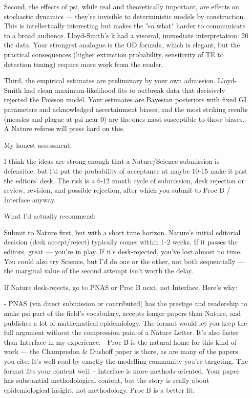   Second, the effects of psi, while real and theoretically important, are effects on stochastic
  dynamics --- they're invisible to deterministic models by construction. This is intellectually
  interesting but makes the "so what" harder to communicate to a broad audience. Lloyd-Smith's k had
  a visceral, immediate interpretation: 20%
   the data. Your strongest analogue is the OD formula, which is elegant, but the practical
  consequences (higher extinction probability, sensitivity of TE to detection timing) require more
  work from the reader.

  Third, the empirical estimates are preliminary by your own admission. Lloyd-Smith had clean
  maximum-likelihood fits to outbreak data that decisively rejected the Poisson model. Your estimates
   are Bayesian posteriors with fixed GI parameters and acknowledged ascertainment biases, and the
  most striking results (measles and plague at psi near 0) are the ones most susceptible to those
  biases. A Nature referee will press hard on this.

  My honest assessment:

  I think the ideas are strong enough that a Nature/Science submission is defensible, but I'd put the
   probability of acceptance at maybe 10-15%
   make it past the editors' desk. The risk is a 6-12 month cycle of submission, desk rejection or
  review, revision, and possible rejection, after which you submit to Proc B / Interface anyway.

  What I'd actually recommend:

  Submit to Nature first, but with a short time horizon. Nature's initial editorial decision (desk
  accept/reject) typically comes within 1-2 weeks. If it passes the editors, great --- you're in
  play. If it's desk-rejected, you've lost almost no time. You could also try Science, but I'd do one
   or the other, not both sequentially --- the marginal value of the second attempt isn't worth the
  delay.

  If Nature desk-rejects, go to PNAS or Proc B next, not Interface. Here's why:

  - PNAS (via direct submission or contributed) has the prestige and readership to make psi part of
  the field's vocabulary, accepts longer papers than Nature, and publishes a lot of mathematical
  epidemiology. The format would let you keep the full argument without the compression pain of a
  Nature Letter. It's also faster than Interface in my experience.
  - Proc B is the natural home for this kind of work --- the Champredon & Dushoff paper is there, as
  are many of the papers you cite. It's well-read by exactly the modelling community you're
  targeting. The format fits your content well.
  - Interface is more methods-oriented. Your paper has substantial methodological content, but the
  story is really about epidemiological insight, not methodology. Proc B is a better fit.

